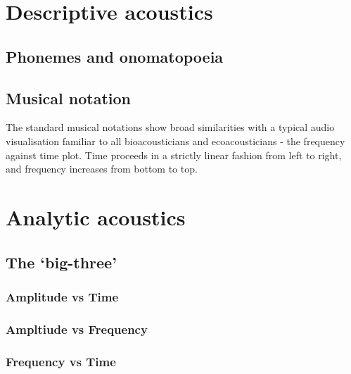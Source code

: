 \documentclass[
]{book}
\begin{document}
\hypertarget{descriptive-acoustics}{%
\section{Descriptive acoustics}\label{descriptive-acoustics}}

\hypertarget{phonemes-and-onomatopoeia}{%
\subsection{Phonemes and onomatopoeia}\label{phonemes-and-onomatopoeia}}

\hypertarget{musical-notation}{%
\subsection{Musical notation}\label{musical-notation}}

The standard musical notations show broad similarities with a typical audio visualisation familiar to all bioacousticians and ecoacousticians - the frequency against time plot. Time proceeds in a strictly linear fashion from left to right, and frequency increases from bottom to top.

\hypertarget{analytic-acoustics}{%
\section{Analytic acoustics}\label{analytic-acoustics}}

\hypertarget{the-big-three}{%
\subsection{The `big-three'}\label{the-big-three}}

\hypertarget{amplitude-vs-time}{%
\subsubsection{Amplitude vs Time}\label{amplitude-vs-time}}

\hypertarget{ampltiude-vs-frequency}{%
\subsubsection{Ampltiude vs Frequency}\label{ampltiude-vs-frequency}}

\hypertarget{frequency-vs-time}{%
\subsubsection{Frequency vs Time}\label{frequency-vs-time}}
\end{document}
